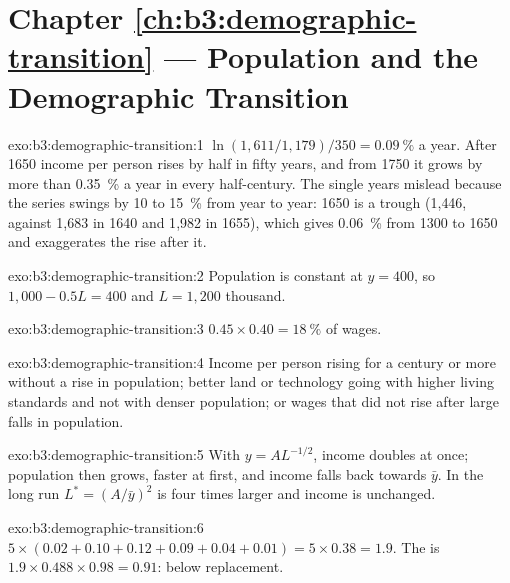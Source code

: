 \section*{Chapter \ref{ch:b3:demographic-transition} --- Population and the Demographic Transition}

\begin{solution}{exo:b3:demographic-transition:1}
$\ln(1{,}611/1{,}179)/350 = 0.09~\%$ a year. After 1650 income per person rises by half in fifty years, and
from 1750 it grows by more than 0.35~\% a year in every half-century. The single years
mislead because the series swings by 10 to 15~\% from year to year: 1650 is a trough
(1{,}446, against 1{,}683 in 1640 and 1{,}982 in 1655), which gives 0.06~\% from 1300 to
1650 and exaggerates the rise after it. %
\end{solution}

\begin{solution}{exo:b3:demographic-transition:2}
Population is constant at $y = 400$, so $1{,}000 - 0.5L = 400$ and $L = 1{,}200$ thousand.
\end{solution}

\begin{solution}{exo:b3:demographic-transition:3}
$0.45 \times 0.40 = 18~\%$ of wages.
\end{solution}

\begin{solution}{exo:b3:demographic-transition:4}
Income per person rising for a century or more without a rise in population;
better land or technology going with higher living standards and not with denser
population; or wages that did not rise after large falls in population.
\end{solution}

\begin{solution}{exo:b3:demographic-transition:5}
With $y = A L^{-1/2}$, income doubles at once; population then grows, faster at first, and
income falls back towards $\bar y$. In the long run $L^* = (A/\bar y)^2$ is four times larger and income is unchanged.
\end{solution}

\begin{solution}{exo:b3:demographic-transition:6}
$5 \times (0.02 + 0.10 + 0.12 + 0.09 + 0.04 + 0.01) = 5 \times 0.38 = 1.9$. The  is $1.9 \times 0.488 \times 0.98 = 0.91$: below replacement.
\end{solution}

